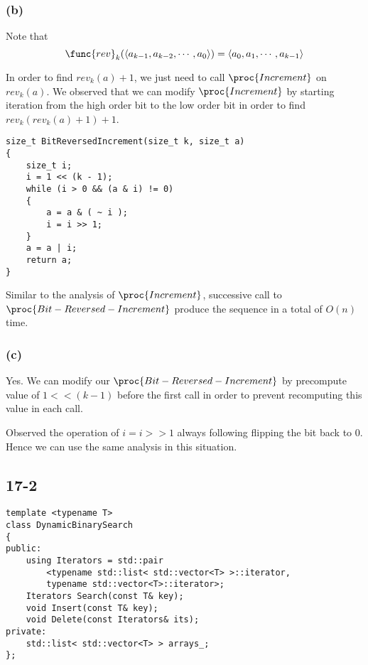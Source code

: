 \subsubsection*{(b)}

Note that
\begin{equation*}
    \func{rev}_k(\langle a_{k-1}, a_{k-2}, \cdots, a_0 \rangle)
     = \langle a_0, a_1, \cdots, a_{k-1} \rangle
\end{equation*}

In order to find $rev_k(a) + 1$, 
we just need to call $\proc{Increment}$ on $rev_k(a)$.
We observed that we can modify $\proc{Increment}$
by starting iteration from the high order bit to the low order bit
in order to find $rev_k( rev_k(a) + 1 ) + 1$.

\begin{verbatim}
size_t BitReversedIncrement(size_t k, size_t a)
{
    size_t i;
    i = 1 << (k - 1);
    while (i > 0 && (a & i) != 0)
    {
        a = a & ( ~ i );
        i = i >> 1;
    }
    a = a | i;
    return a;
}
\end{verbatim}

Similar to the analysis of $\proc{Increment}$,
successive call to $\proc{Bit-Reversed-Increment}$
produce the sequence in a total of $O(n)$ time.

\subsubsection*{(c)}

Yes.
We can modify our $\proc{Bit-Reversed-Increment}$
by precompute value of $1 << (k - 1)$ before the first call
in order to prevent recomputing this value in each call. 

Observed the operation of $i = i >> 1$ always following 
flipping the bit back to $0$.
Hence we can use the same analysis in this situation.

\subsection*{17-2}

\begin{verbatim}
template <typename T>
class DynamicBinarySearch
{
public:
    using Iterators = std::pair
        <typename std::list< std::vector<T> >::iterator, 
        typename std::vector<T>::iterator>;
    Iterators Search(const T& key);
    void Insert(const T& key);
    void Delete(const Iterators& its);
private:
    std::list< std::vector<T> > arrays_;
};
\end{verbatim}
    
